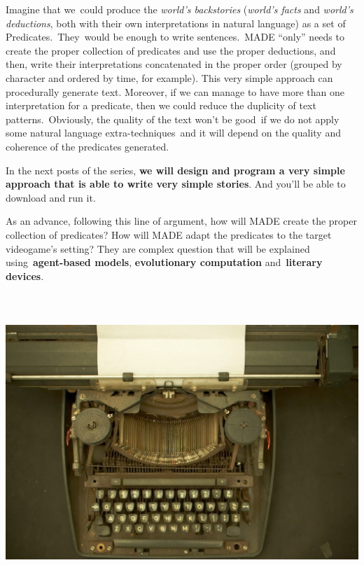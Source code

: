 \documentclass[a4paper]{article}
\newcommand\textstyleStrongEmphasis[1]{\textbf{#1}}
\newcommand\textstyleEmphasis[1]{\textit{#1}}
\begin{document}
Imagine that we~could produce the
\textstyleEmphasis{world{\textquoteright}s backstories}
(\textstyleEmphasis{world{\textquoteright}s facts} and
\textstyleEmphasis{world{\textquoteright}s deductions}, both with their
own interpretations in natural language) as a set of
Predicates.~They~would be enough to write sentences.~MADE
{\textquotedblleft}only{\textquotedblright} needs to create the proper
collection of predicates and use the proper deductions, and then, write
their interpretations concatenated in the proper order (grouped by
character and ordered by time, for example). This very simple approach
can procedurally generate text. Moreover, if we can manage to have more
than one interpretation for a predicate, then we could reduce the
duplicity of text patterns.~Obviously, the quality of the text
won{\textquoteright}t be good~if we do not apply some natural language
extra-techniques~and it will depend on the quality and coherence of the
predicates generated.

In the next posts of the series, \textstyleStrongEmphasis{we will design
and program a very simple approach that is able to write very simple
stories}. And you{\textquoteright}ll be able to download and run it.

As an advance, following this line of argument, how will MADE create the
proper collection of predicates? How will MADE adapt the predicates to
the target videogame{\textquoteright}s setting? They are complex
question that will be explained
using~\textstyleStrongEmphasis{agent-based models},
\textstyleStrongEmphasis{evolutionary computation}
and~\textstyleStrongEmphasis{literary devices}.

\href{http://www.velonuboso.com/made/blog/wp-content/uploads/2015/06/4304182484_01eddd85b8_o.jpg}{
\includegraphics[width=16.956cm,height=11.269cm]{makingofmade113-img4.jpg}
}
\end{document}
